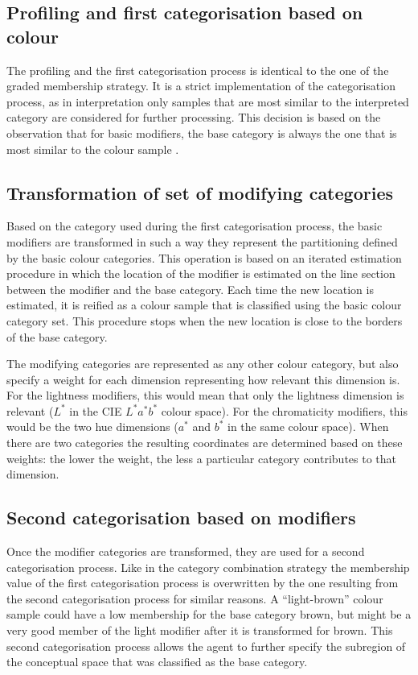 \subsection{Profiling and first categorisation based on colour}

The profiling and the first categorisation process is identical to the
one of the graded membership strategy. It is a strict
implementation of the categorisation process, as in interpretation
only samples that are most similar to the interpreted category are
considered for further processing. This decision is based on the
observation that for basic modifiers, the base category is always
the one that is most similar to the colour sample
\citep{safuanova07russian}.

\subsection{Transformation of set of modifying categories}

Based on the category used during the first categorisation process,
the basic modifiers are transformed in such a way they represent 
the partitioning defined by the basic colour categories. This
operation is based on an iterated estimation procedure in which the
location of the modifier is estimated on the line section between the
modifier and the base category. Each time the new location is
estimated, it is reified as a colour sample that is classified using
the basic colour category set. This procedure stops when the new
location is close to the borders of the base category.

The modifying categories are represented as any other colour category,
but also specify a weight for each dimension representing how
relevant this dimension is. For the lightness modifiers, this would
mean that only the lightness dimension is relevant ($L^*$ in the CIE $L^*a^*b^*$ colour
space). For the chromaticity modifiers, this would be the two hue
dimensions ($a^*$ and $b^*$ in the same colour space). When there are two
categories the resulting coordinates are determined based on these
weights: the lower the weight, the less a particular category
contributes to that dimension.

\subsection{Second categorisation based on modifiers}

Once the modifier categories are transformed, they are used for a
second categorisation process. Like in the category combination
  strategy the membership value of the first categorisation process
is overwritten by the one resulting from the second categorisation
process for similar reasons. A ``light-brown'' colour sample could
have a low membership for the base category brown, but might be a very
good member of the light modifier after it is transformed for
brown. This second categorisation process allows the agent to further
specify the subregion of the conceptual space that was classified as
the base category.

